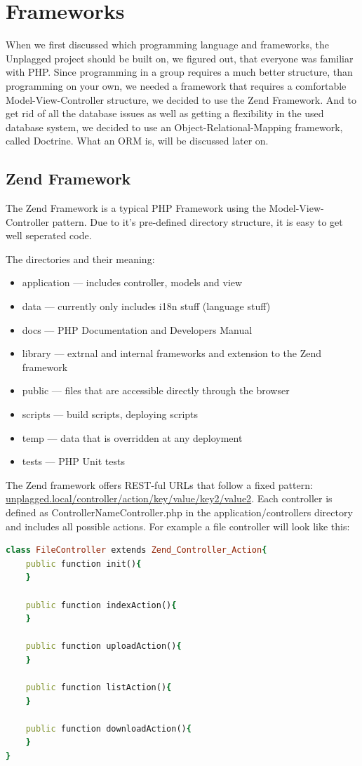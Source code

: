 \section{Frameworks}
When we first discussed which programming language and frameworks, the Unplagged project should be built on, we figured out, that everyone was familiar with PHP. Since programming in a group requires a much better structure, than programming on your own, we needed a framework that requires a comfortable Model-View-Controller structure, we decided to use the Zend Framework. And to get rid of all the database issues as well as getting a flexibility in the used database system, we decided to use an Object-Relational-Mapping framework, called Doctrine. What an ORM is, will be discussed later on.

\subsection{Zend Framework}
The Zend Framework is a typical PHP Framework using the Model-View-Controller pattern. Due to it's pre-defined directory structure, it is easy to get well seperated code. 

The directories and their meaning:
\begin{itemize}
\item application --- includes controller, models and view
\item data --- currently only includes i18n stuff (language stuff)
\item docs --- PHP Documentation and Developers Manual
\item library --- extrnal and internal frameworks and extension to the Zend framework
\item public --- files that are accessible directly through the browser
\item scripts --- build scripts, deploying scripts
\item temp --- data that is overridden at any deployment
\item tests --- PHP Unit tests
\end{itemize}

The Zend framework offers REST-ful URLs that follow a fixed pattern: \url{unplagged.local/controller/action/key/value/key2/value2}. Each controller is defined as ControllerNameController.php in the application/controllers directory and includes all possible actions. For example a file controller will look like this:

\begin{lstlisting}[caption=Persisting an object to the database in Doctrine, label=list:persistingObjectDoctrine, language=Ruby]
class FileController extends Zend_Controller_Action{
	public function init(){
	}

	public function indexAction(){
	}

	public function uploadAction(){
	}

  	public function listAction(){
	}
  	
	public function downloadAction(){
	}
}
\end{lstlisting}

